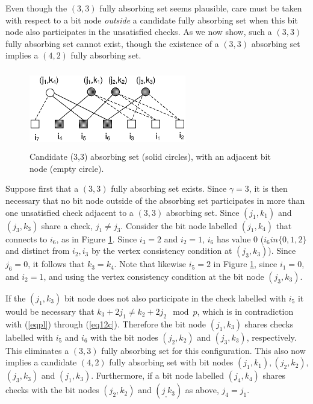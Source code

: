 Even though the $(3,3)$ fully absorbing set seems plausible, care
must be taken with respect to a bit node \emph{outside} a
candidate fully absorbing set when this bit node also participates
in the unsatisfied checks. As we now show, such a $(3,3)$ fully
absorbing set cannot exist, though the existence of a $(3,3)$
absorbing set implies  a $(4,2)$ fully absorbing set.

\begin{figure}
\center\includegraphics[width=2.7in,height=1.35in]{fig05c.eps}
\caption{Candidate (3,3) absorbing set (solid circles), with an
adjacent bit node (empty circle).}\label{Fig05a}
\end{figure}

Suppose first that a $(3,3)$ fully absorbing set exists. Since
$\gamma=3$, it is then necessary that no bit node outside of the
absorbing set participates in more than one unsatisfied check
adjacent to a $(3,3)$ absorbing set. Since $(j_1,k_1)$ and
$(j_3,k_3)$ share a check, $j_1 \neq j_3$. Consider the bit node
labelled $(j_1,k_4)$ that connects to $i_6$, as in Figure
\ref{Fig05a}. Since $i_3=2$ and $i_2=1$, $i_6$ has value 0 ($i_6
in\{0,1,2\}$ and distinct from $i_2,i_3$ by the vertex consistency
condition at $(j_3,k_3)$). Since $j_6=0$, it follows that $k_3=k_4$.
Note that likewise $i_5=2$ in Figure \ref{Fig05a}, since $i_1=0$,
and $i_2=1$, and using the vertex consistency condition at the bit
node $(j_3,k_3)$.

If the $(j_1,k_3)$ bit node does not also participate in the check
labelled with $i_5$ it would be necessary that $k_3+2j_1 \neq
k_2+2j_2 \mod p$, which is in contradiction with (\ref{eqpl})
through (\ref{eq12c}). Therefore the bit node $(j_1,k_3)$ shares
checks labelled with $i_5$ and $i_6$ with the bit nodes
$(j_2,k_2)$ and  $(j_3,k_3)$, respectively. This eliminates a
$(3,3)$ fully absorbing set for this configuration. This also now
implies a candidate $(4,2)$ fully absorbing set with bit nodes
$(j_1,k_1), (j_2,k_2)$, $(j_3,k_3)$ and $(j_1,k_3)$. Furthermore,
if a bit node labelled $(j_4,k_4)$ shares checks with the bit
nodes $(j_2,k_2)$ and $(j_,k_3)$ as above, $j_4=j_1$.


